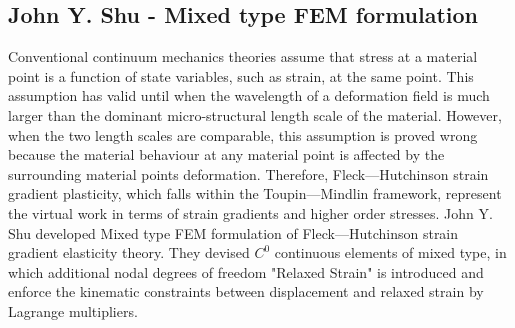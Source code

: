 \documentclass[12pt]{article}
\begin{document}
\subsection{John Y. Shu - Mixed type FEM formulation}
\vspace{0.4cm}
Conventional continuum mechanics theories assume that stress at a material point is a function
of state variables, such as strain, at the same point. This assumption has valid until when the wavelength of a deformation field is much larger than the dominant micro-structural length scale of the material. However, when the two length scales are comparable, this assumption is proved wrong because the material behaviour at any material point is affected by the surrounding material points deformation. Therefore, Fleck—Hutchinson strain gradient plasticity, which falls within the Toupin—Mindlin framework, represent the virtual work in terms of strain gradients and higher order stresses.
\newline
\newline
John Y. Shu developed Mixed type FEM formulation of Fleck—Hutchinson strain gradient elasticity theory. They devised $C^0$ continuous elements of mixed type, in which additional nodal degrees of freedom "Relaxed Strain" is introduced and enforce the kinematic constraints between displacement and relaxed strain by Lagrange multipliers.
\newline
\end{document}
